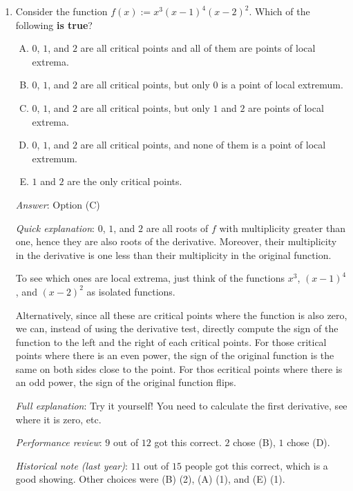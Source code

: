 \documentclass[10pt]{amsart}
\begin{document}
\begin{enumerate}

\item Consider the function $f(x) := x^3(x - 1)^4(x - 2)^2$. Which of
  the following {\bf is true}?

  \begin{enumerate}[(A)]
  \item $0$, $1$, and $2$ are all critical points and all of them are
    points of local extrema.
  \item $0$, $1$, and $2$ are all critical points, but only $0$ is a
    point of local extremum.
  \item $0$, $1$, and $2$ are all critical points, but only $1$ and
    $2$ are points of local extrema.
  \item $0$, $1$, and $2$ are all critical points, and none of them is
    a point of local extremum.
  \item $1$ and $2$ are the only critical points.
  \end{enumerate}

  {\em Answer}: Option (C)

  {\em Quick explanation}: $0$, $1$, and $2$ are all roots of $f$ with
  multiplicity greater than one, hence they are also roots of the
  derivative. Moreover, their multiplicity in the derivative is one
  less than their multiplicity in the original function.

  To see which ones are local extrema, just think of the functions
  $x^3$, $(x - 1)^4$, and $(x - 2)^2$ as isolated functions.

  Alternatively, since all these are critical points where the
  function is also zero, we can, instead of using the derivative test,
  directly compute the sign of the function to the left and the right
  of each critical points. For those critical points where there is an
  even power, the sign of the original function is the same on both
  sides close to the point. For thos ecritical points where there is
  an odd power, the sign of the original function flips.

  {\em Full explanation}: Try it yourself! You need to calculate the
  first derivative, see where it is zero, etc.

  {\em Performance review}: $9$ out of $12$ got this correct. $2$
  chose (B), $1$ chose (D).

  {\em Historical note (last year)}: $11$ out of $15$ people got this
  correct, which is a good showing. Other choices were (B) (2), (A)
  (1), and (E) (1).


\end{enumerate}
\end{document}
